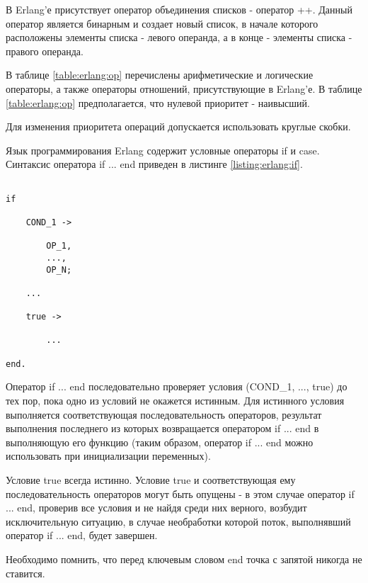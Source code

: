 		В Erlang'е присутствует оператор объединения списков - оператор ++. Данный оператор является бинарным и создает новый список, в начале которого расположены элементы списка - левого операнда, а в конце - элементы списка - правого операнда.



В таблице \ref{table:erlang:op} перечислены арифметические и логические операторы, а также операторы отношений, присутствующие в Erlang'е. В таблице \ref{table:erlang:op} предполагается, что нулевой приоритет - наивысший.

Для изменения приоритета операций допускается использовать круглые скобки.




Язык программирования Erlang содержит условные операторы if и case. Синтаксис оператора if ... end приведен в листинге \ref{listing:erlang:if}.

\begin{lstlisting}

if
	
	COND_1 ->

		OP_1,
		...,
		OP_N;

	...

	true ->

		...

end.

\end{lstlisting}
\mylistingend

Оператор if ... end последовательно проверяет условия (COND\_1, ..., true) до тех пор, пока одно из условий не окажется истинным. Для истинного условия выполняется соответствующая последовательность операторов, результат выполнения последнего из которых возвращается оператором if ... end в выполняющую его функцию (таким образом, оператор if ... end можно использовать при инициализации переменных).

Условие true всегда истинно. Условие true и соответствующая ему последовательность операторов могут быть опущены - в этом случае оператор if ... end, проверив все условия и не найдя среди них верного, возбудит исключительную ситуацию, в случае необработки которой поток, выполнявший оператор if ... end, будет завершен.

Необходимо помнить, что перед ключевым словом end точка с запятой никогда не ставится.

